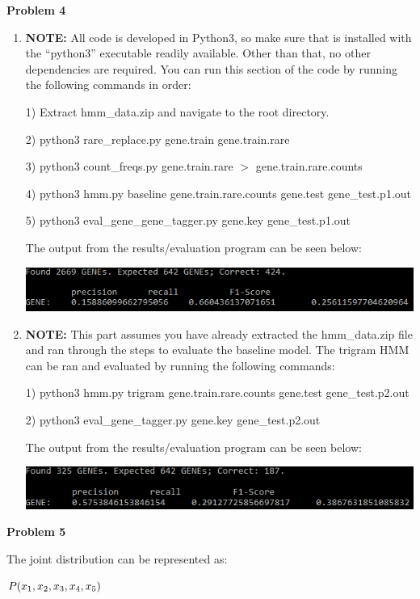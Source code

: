 \documentclass[12pt]{article}
\begin{document}
\pagebreak\textbf{Problem 4}
\begin{enumerate}
	\item \textbf{NOTE:} All code is developed in Python3, so make sure that is installed with the ``python3'' executable readily available. Other than that, no other dependencies are required. You can run this section of the code by running the following commands in order:
	
	1) Extract hmm\_data.zip and navigate to the root directory.
	
	2) python3 rare\_replace.py gene.train gene.train.rare
	
	3) python3 count\_freqs.py gene.train.rare $>$ gene.train.rare.counts
	
	4) python3 hmm.py baseline gene.train.rare.counts gene.test gene\_test.p1.out
	
	5) python3 eval\_gene\_gene\_tagger.py gene.key gene\_test.p1.out
	
	The output from the results/evaluation program can be seen below:
	
	\includegraphics[]{baseline_results}
	
	\item \textbf{NOTE:} This part assumes you have already extracted the hmm\_data.zip file and ran through the steps to evaluate the baseline model. The trigram HMM can be ran and evaluated by running the following commands:
	
	1) python3 hmm.py trigram gene.train.rare.counts gene.test gene\_test.p2.out
	
	2) python3 eval\_gene\_tagger.py gene.key gene\_test.p2.out
	
	The output from the results/evaluation program can be seen below:
	
	\includegraphics[]{trigram_results}
\end{enumerate}

\pagebreak\textbf{Problem 5}

The joint distribution can be represented as:

$P(x_1, x_2, x_3, x_4, x_5) \\$
\end{document}
